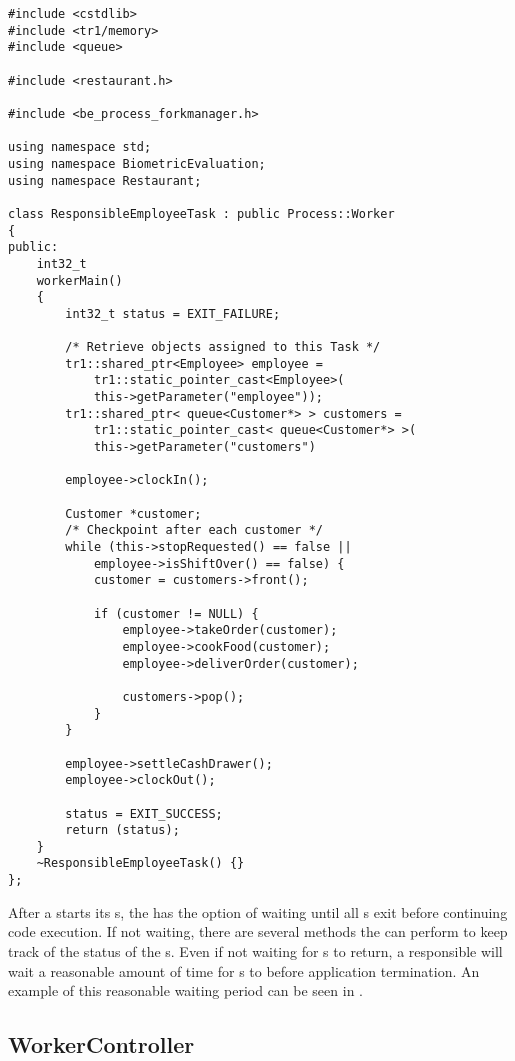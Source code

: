\begin{lstlisting}[caption={A Responsible \class{Worker} Implementation}, label=process_worker-example]
#include <cstdlib>
#include <tr1/memory>
#include <queue>

#include <restaurant.h>

#include <be_process_forkmanager.h>

using namespace std;
using namespace BiometricEvaluation;
using namespace Restaurant;

class ResponsibleEmployeeTask : public Process::Worker
{
public:
	int32_t
	workerMain()
	{
		int32_t status = EXIT_FAILURE;
		
		/* Retrieve objects assigned to this Task */
		tr1::shared_ptr<Employee> employee =
		    tr1::static_pointer_cast<Employee>(
		    this->getParameter("employee"));
		tr1::shared_ptr< queue<Customer*> > customers = 
		    tr1::static_pointer_cast< queue<Customer*> >(
		    this->getParameter("customers")
		
		employee->clockIn();
		
		Customer *customer;
		/* Checkpoint after each customer */
		while (this->stopRequested() == false ||
		    employee->isShiftOver() == false) {
			customer = customers->front();
			
			if (customer != NULL) {
				employee->takeOrder(customer);
				employee->cookFood(customer);
				employee->deliverOrder(customer);
				
				customers->pop();
			}
		}
		
		employee->settleCashDrawer();
		employee->clockOut();
		
		status = EXIT_SUCCESS;
		return (status);
	}
	~ResponsibleEmployeeTask() {}
};
\end{lstlisting}

After a  starts its s, the  has the
option of waiting until all s exit 
before continuing code execution.  If not waiting,
there are several methods the  can perform to keep track of the status of the
s.  Even if not waiting for s to return,
a responsible  will wait a reasonable amount of time for
s to  before application termination.  An example of this
reasonable waiting period can be seen in .

\subsection{WorkerController}
\label{subsec-process_workercontroller}

